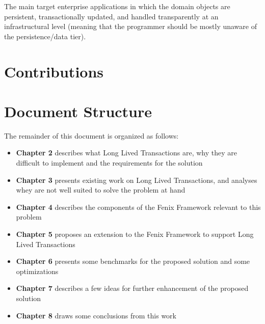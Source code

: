 The main target enterprise applications in
which the domain objects are persistent, transactionally updated, and
handled transparently at an infrastructural level (meaning that the
programmer should be mostly unaware of the persistence/data tier).

\section{Contributions}



\section{Document Structure}

The remainder of this document is organized as follows:

\begin{itemize}

\item {\bf Chapter 2} describes what Long Lived Transactions are, why
  they are difficult to implement and the requirements for the solution

\item {\bf Chapter 3} presents existing work on Long Lived
  Transactions, and analyses whey are not well suited to solve the
  problem at hand

\item {\bf Chapter 4} describes the components of the Fenix Framework
  relevant to this problem

\item {\bf Chapter 5} proposes an extension to the Fenix Framework to
  support Long Lived Transactions

\item {\bf Chapter 6} presents some benchmarks for the proposed
  solution and some optimizations

\item {\bf Chapter 7} describes a few ideas for further enhancement of
  the proposed solution

\item {\bf Chapter 8} draws some conclusions from this work

\end{itemize}